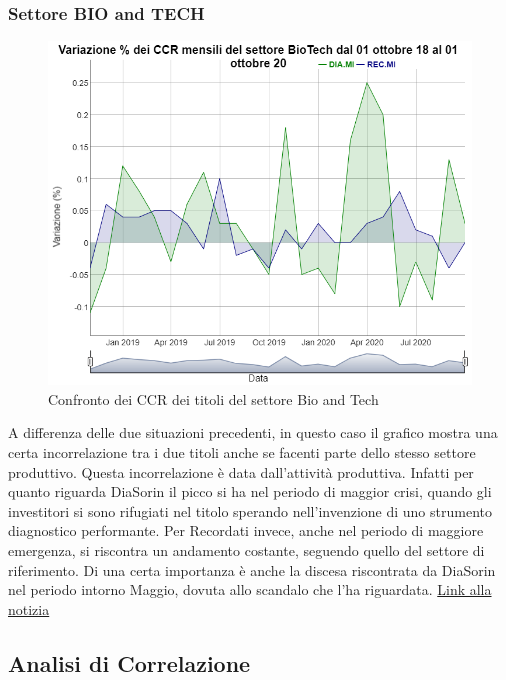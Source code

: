 \documentclass[12pt]{article}
\begin{document}
\subsubsection{Settore BIO and TECH}
\begin{figure}[!htb]
    \centering
    \includegraphics[width=1\textwidth]{immagini/setBio.png}
    \caption{Confronto dei CCR dei titoli del settore Bio and Tech}
\end{figure}
\FloatBarrier
A differenza delle due situazioni precedenti, in questo caso il grafico mostra una certa incorrelazione tra i due titoli anche se facenti parte dello stesso settore produttivo. Questa incorrelazione è data dall'attività produttiva. Infatti per quanto riguarda DiaSorin il picco si ha nel periodo di maggior crisi, quando gli investitori si sono rifugiati nel titolo sperando nell'invenzione di uno strumento diagnostico performante. Per Recordati invece, anche nel periodo di maggiore emergenza, si riscontra un andamento costante, seguendo quello del settore di riferimento. Di una certa importanza è anche la discesa riscontrata da DiaSorin nel periodo intorno Maggio, dovuta allo scandalo che l'ha riguardata. \href{https://www.lastampa.it/cronaca/2020/05/12/news/la-procura-di-milano-indaga-sull-affidamento-dei-test-sierologici-alla-diasorin-1.38835534}{Link alla notizia}
\newpage
\subsection{Analisi di Correlazione}
\end{document}
